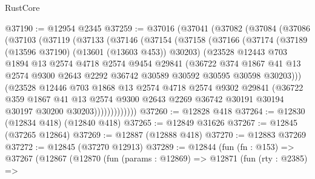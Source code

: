 \begin{lexlean}{RustCore}
\begin{coremodule}
@37190 := @12954 @2345
@37259 := @37016
    (@37041
      (@37082
        (@37084
          (@37086
            (@37103
              (@37119
                (@37133
                  (@37146
                    (@37154
                      (@37158
                        (@37166
                          (@37174
                            (@37189 (@13596 @37190) (@13601 (@13603 @453)) @30203)
                            (@23528
                              @12443
                              @703
                              @1894
                              @13
                              @2574
                              @4718
                              @2574
                              @9454
                              @29841
                              (@36722
                                @374
                                @1867
                                @41
                                @13
                                @2574
                                @9300
                                @2643
                                @2292
                                @36742
                                @30589
                                @30592
                                @30595
                                @30598
                                @30203)))
                          (@23528
                            @12446
                            @703
                            @1868
                            @13
                            @2574
                            @4718
                            @2574
                            @9302
                            @29841
                            (@36722
                              @359
                              @1867
                              @41
                              @13
                              @2574
                              @9300
                              @2643
                              @2269
                              @36742
                              @30191
                              @30194
                              @30197
                              @30200
                              @30203)))))))))))))
@37260 := @12828 @418
@37264 := @12830 (@12834 @418) (@12840 @418)
@37265 := @12849 @31626
@37267 := @12845 (@37265 @12864)
@37269 := @12887 (@12888 @418)
@37270 := @12883 @37269
@37272 := @12845 (@37270 @12913)
@37289 := @12844
    (fun (fn : @153) =>
    @37267
      (@12867
        (@12870
          (fun (params : @12869) =>
          @12871
            (fun (rty : @2385) =>

\end{coremodule}
\end{lexlean}

